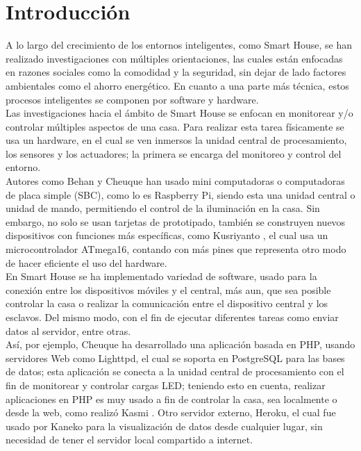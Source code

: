 \chapter{Introducción}

 A lo largo del crecimiento de los entornos inteligentes, como Smart House, se han realizado investigaciones con múltiples orientaciones, las cuales están enfocadas en razones sociales como la comodidad y la seguridad, sin dejar de lado factores ambientales como el ahorro energético. En cuanto a una parte más técnica, estos procesos inteligentes se componen por software y hardware.\\
 
 Las investigaciones hacia el ámbito de Smart House se enfocan en monitorear y/o controlar múltiples aspectos de una casa. Para realizar esta tarea físicamente se usa un hardware, en el cual se ven inmersos la unidad central de procesamiento, los sensores y los actuadores; la primera se encarga del monitoreo y control del entorno.\\
 
 Autores como Behan \cite{Behan2013} y Cheuque \cite{Cheuque2015} han usado mini computadoras o computadoras de placa simple (SBC), como lo es Raspberry Pi, siendo esta una unidad central o unidad de mando, permitiendo el control de la iluminación en la casa. Sin embargo, no solo se usan tarjetas de prototipado, también se construyen nuevos dispositivos con funciones más específicas, como Kusriyanto \cite{Kusriyanto2015}, el cual usa un microcontrolador ATmega16, contando con más pines que representa otro modo de hacer eficiente el uso del hardware.\\
 
 En Smart House se ha implementado variedad de software, usado para la conexión entre los dispositivos móviles y el central, más aun, que sea posible controlar la casa o realizar la comunicación entre el dispositivo central y los esclavos. Del mismo modo, con el fin de ejecutar diferentes tareas como enviar datos al servidor, entre otras.\\
 
 Así, por ejemplo, Cheuque \cite{Cheuque2015} ha desarrollado una aplicación basada en PHP, usando servidores Web como Lighttpd, el cual se soporta en PostgreSQL para las bases de datos; esta aplicación se conecta a la unidad central de procesamiento con el fin de monitorear y controlar cargas LED; teniendo esto en cuenta, realizar aplicaciones en PHP es muy usado a fin de controlar la casa, sea localmente o desde la web, como realizó Kasmi \cite{Kasmi2016}. Otro servidor externo, Heroku, el cual fue usado por Kaneko \cite{Kaneko2017} para la visualización de datos desde cualquier lugar, sin necesidad de tener el servidor local compartido a internet.\\
 
